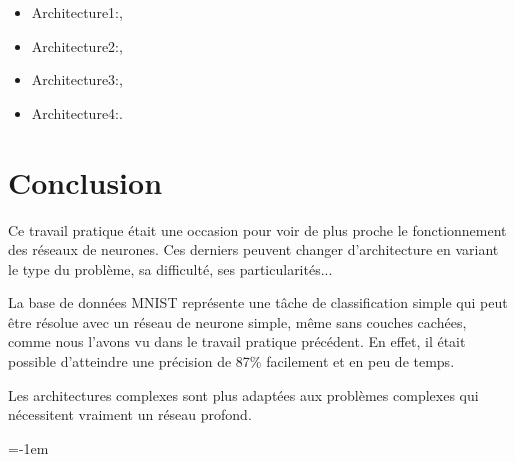 \documentclass[a4paper,english,12pt]{article}
\makeatletter
\newcommand{\emptypage}[1]{
  \cleardoublepage
  \begingroup
  \let\ps@plain\ps@empty
  \pagestyle{empty}
  #1
  \cleardoublepage
  \endgroup}
\makeatother
\begin{document}
\begin{itemize}
	\item Architecture1:,
	\item Architecture2:,
	\item Architecture3:,
	\item Architecture4:.
\end{itemize}

\section{Conclusion}
Ce travail pratique était une occasion pour voir de plus proche le fonctionnement des réseaux de neurones. Ces derniers peuvent changer d'architecture en variant le type du problème, sa difficulté, ses particularités... 

La base de données MNIST représente une tâche de classification simple qui peut être résolue avec un réseau de neurone simple, même sans couches cachées, comme nous l'avons vu dans le travail pratique précédent. En effet, il était possible d'atteindre une précision de 87\% facilement et en peu de temps.

Les architectures complexes sont plus adaptées aux problèmes complexes qui nécessitent vraiment un réseau profond.

\parskip=-1em
\let\section\oldsection %
%
\end{document}
